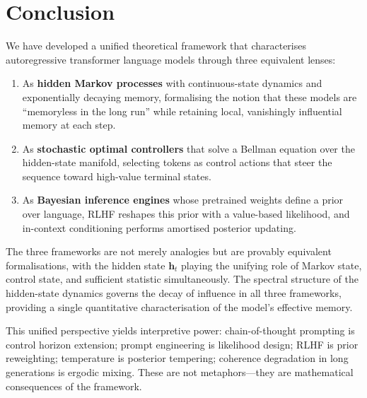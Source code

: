 \documentclass[11pt,a4paper]{article}
\theoremstyle{plain}
\theoremstyle{definition}
\theoremstyle{remark}
\begin{document}
\section{Conclusion}\label{sec:conclusion}

We have developed a unified theoretical framework that characterises
autoregressive transformer language models through three equivalent lenses:

\begin{enumerate}[nosep]
  \item As \textbf{hidden Markov processes} with continuous-state dynamics and
        exponentially decaying memory, formalising the notion that these models
        are ``memoryless in the long run'' while retaining local, vanishingly
        influential memory at each step.

  \item As \textbf{stochastic optimal controllers} that solve a Bellman equation
        over the hidden-state manifold, selecting tokens as control actions that
        steer the sequence toward high-value terminal states.

  \item As \textbf{Bayesian inference engines} whose pretrained weights define a
        prior over language, RLHF reshapes this prior with a value-based
        likelihood, and in-context conditioning performs amortised posterior
        updating.
\end{enumerate}

The three frameworks are not merely analogies but are provably equivalent
formalisations, with the hidden state $\bm{h}_t$ playing the unifying role
of Markov state, control state, and sufficient statistic simultaneously.
The spectral structure of the hidden-state dynamics governs the decay of
influence in all three frameworks, providing a single quantitative
characterisation of the model's effective memory.

This unified perspective yields interpretive power: chain-of-thought prompting
is control horizon extension; prompt engineering is likelihood design; RLHF is
prior reweighting; temperature is posterior tempering; coherence degradation in
long generations is ergodic mixing. These are not metaphors---they are
mathematical consequences of the framework.

\bigskip
\end{document}
